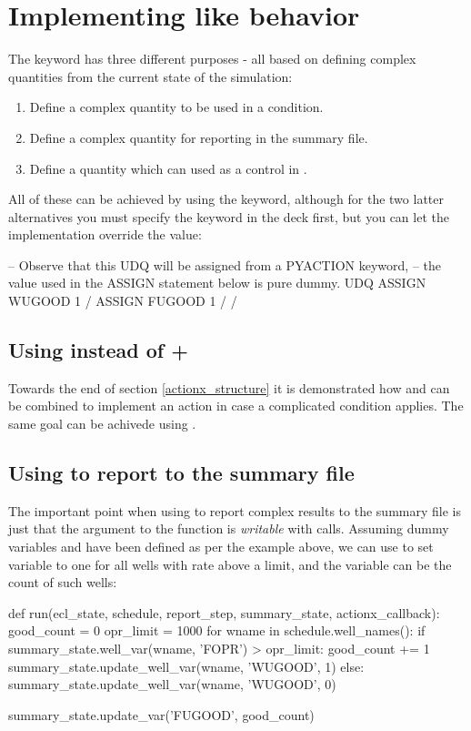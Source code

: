 \section{Implementing \udq{} like behavior}
The \udq{} keyword has three different purposes - all based on defining 
complex quantities from the current state of the simulation:

\begin{enumerate}
\item Define a complex quantity to be used in a \actionx{} condition.
\item Define a complex quantity for reporting in the summary file.
\item Define a quantity which can used as a control in .
\end{enumerate}

All of these can be achieved by using the \pyaction{} keyword, although for the
two latter alternatives you must specify the \udq{} keyword in the deck first,
but you can let the \pyaction{} implementation override the value:
\begin{deck}
-- Observe that this UDQ will be assigned from a PYACTION keyword,
-- the value used in the ASSIGN statement below is pure dummy.
UDQ
  ASSIGN WUGOOD 1 /
  ASSIGN FUGOOD 1 /
/
\end{deck}

\subsection{Using \pyaction{} instead of \udq{} + \actionx{}}
Towards the end of section \ref{actionx_structure} it is demonstrated how \udq{}
and \actionx{} can be combined to implement an action in case a complicated
condition applies. The same goal can be achivede using \pyaction{}.


\subsection{Using \pyaction{} to report to the summary file}
The important point when using \pyaction{} to report complex results to the
summary file is just that the  argument to the
 function is \emph{writable} with 
calls. Assuming dummy \udq{} variables  and  have been
defined as per the example above, we can use \pyaction{} to set variable
 to one for all wells with rate above a limit, and the 
variable can be the count of such wells:
\begin{code}
def run(ecl_state, schedule, report_step, summary_state, actionx_callback):
    good_count = 0
    opr_limit = 1000
    for wname in schedule.well_names():
        if summary_state.well_var(wname, 'FOPR') > opr_limit:
            good_count += 1
            summary_state.update_well_var(wname, 'WUGOOD', 1)
        else:
            summary_state.update_well_var(wname, 'WUGOOD', 0)

    summary_state.update_var('FUGOOD', good_count)
\end{code}




